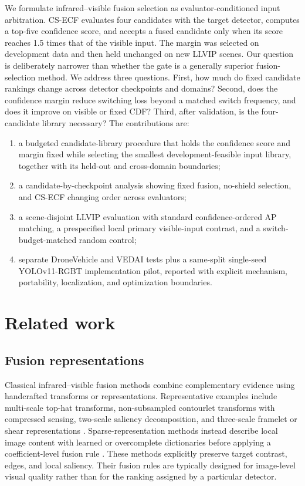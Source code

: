 \documentclass[preprint,11pt]{elsarticle}
\begin{document}
We formulate infrared--visible fusion selection as evaluator-conditioned input
arbitration. CS-ECF evaluates four candidates with the target detector,
computes a top-five confidence score, and accepts a fused candidate only when
its score reaches 1.5 times that of the visible input. The margin was selected
on development data and then held unchanged on new LLVIP scenes. Our question
is deliberately narrower than whether the gate is a generally superior
fusion-selection method. We address three questions. First, how much do fixed
candidate rankings change across detector checkpoints and domains? Second, does
the confidence margin reduce switching loss beyond a matched switch frequency,
and does it improve on visible or fixed CDF? Third, after validation, is the
four-candidate library necessary? The contributions are:
\begin{enumerate}
  \item a budgeted candidate-library procedure that holds the confidence score
  and margin fixed while selecting the smallest development-feasible input
  library, together with its held-out and cross-domain boundaries;
  \item a candidate-by-checkpoint analysis showing fixed fusion, no-shield
  selection, and CS-ECF changing order across evaluators;
  \item a scene-disjoint LLVIP evaluation with standard confidence-ordered
  AP matching, a prespecified local primary visible-input contrast, and a
  switch-budget-matched random control;
  \item separate DroneVehicle and VEDAI tests plus a same-split single-seed
  YOLOv11-RGBT implementation pilot, reported with explicit mechanism,
  portability, localization, and optimization boundaries.
\end{enumerate}

\section{Related work}

\subsection{Fusion representations}

Classical infrared--visible fusion methods combine complementary evidence using
handcrafted transforms or representations. Representative examples include
multi-scale top-hat transforms, non-subsampled contourlet transforms with
compressed sensing, two-scale saliency decomposition, and three-scale framelet
or shear representations \cite{zhu2017tophat,zhang2016nsct,zhang2021twoscale,wei2017threescale}.
Sparse-representation methods instead describe local image content with learned
or overcomplete dictionaries before applying a coefficient-level fusion rule
\cite{yin2013sparsefusion,yin2015multiscale}. These methods explicitly preserve
target contrast, edges, and local saliency. Their fusion rules are typically
designed for image-level visual quality rather than for the ranking assigned by
a particular detector.
\end{document}
